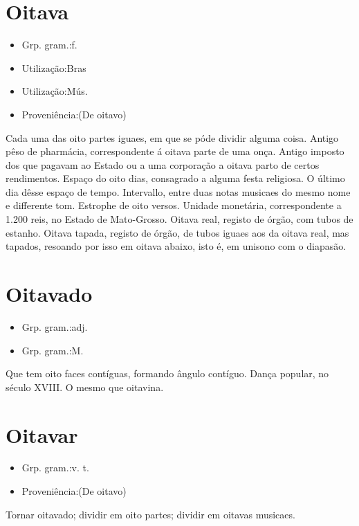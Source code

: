 \section{Oitava}
\begin{itemize}
\item {Grp. gram.:f.}
\end{itemize}
\begin{itemize}
\item {Utilização:Bras}
\end{itemize}
\begin{itemize}
\item {Utilização:Mús.}
\end{itemize}
\begin{itemize}
\item {Proveniência:(De \textunderscore oitavo\textunderscore )}
\end{itemize}
Cada uma das oito partes iguaes, em que se póde dividir alguma coisa.
Antigo pêso de pharmácia, correspondente á oitava parte de uma onça.
Antigo imposto dos que pagavam ao Estado ou a uma corporação a oitava parto de certos rendimentos.
Espaço do oito dias, consagrado a alguma festa religiosa.
O último dia dêsse espaço de tempo.
Intervallo, entre duas notas musicaes do mesmo nome e differente tom.
Estrophe de oito versos.
Unidade monetária, correspondente a 1.200 reis, no Estado de Mato-Grosso.
\textunderscore Oitava real\textunderscore , registo de órgão, com tubos de estanho.
\textunderscore Oitava tapada\textunderscore , registo de órgão, de tubos iguaes aos da oitava real, mas tapados, resoando por isso em oitava abaixo, isto é, em unisono com o diapasão.
\section{Oitavado}
\begin{itemize}
\item {Grp. gram.:adj.}
\end{itemize}
\begin{itemize}
\item {Grp. gram.:M.}
\end{itemize}
Que tem oito faces contíguas, formando ângulo contíguo.
Dança popular, no século XVIII.
O mesmo que \textunderscore oitavina\textunderscore .
\section{Oitavar}
\begin{itemize}
\item {Grp. gram.:v. t.}
\end{itemize}
\begin{itemize}
\item {Proveniência:(De \textunderscore oitavo\textunderscore )}
\end{itemize}
Tornar oitavado; dividir em oito partes; dividir em oitavas musicaes.
